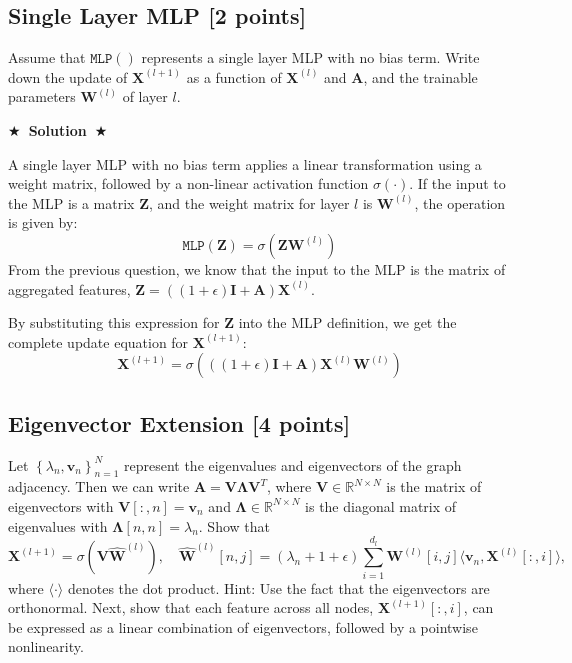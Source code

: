 \documentclass{article}
\numberwithin{figure}{section}
\newcommand{\Solution}[1]{%
    {%
        \medskip
        \color{red}
        \bf $\bigstar$~\sf\textbf{Solution}~$\bigstar$ \sf
        #1
    }
    \bigskip
}
\begin{document}
\subsection{Single Layer MLP [2 points]}
Assume that $\texttt{MLP}\left(\right)$ represents a single layer MLP with no bias term. Write down the update of $\mathbf{X}^{(l+1)}$ as a function of $\mathbf{X}^{(l)}$ and $\mathbf{A}$, and the trainable parameters $\mathbf{W}^{(l)}$ of layer $l$.

\Solution{
	A single layer MLP with no bias term applies a linear transformation using a weight matrix, followed by a non-linear activation function $\sigma(\cdot)$. If the input to the MLP is a matrix $\mathbf{Z}$, and the weight matrix for layer $l$ is $\mathbf{W}^{(l)}$, the operation is given by:
	\[ \texttt{MLP}(\mathbf{Z}) = \sigma(\mathbf{Z}\mathbf{W}^{(l)}) \]
	From the previous question, we know that the input to the MLP is the matrix of aggregated features, $\mathbf{Z} = \left( (1+\epsilon)\mathbf{I} + \mathbf{A}\right) \mathbf{X}^{(l)}$.
	
	By substituting this expression for $\mathbf{Z}$ into the MLP definition, we get the complete update equation for $\mathbf{X}^{(l+1)}$:
	\begin{equation}
		\mathbf{X}^{(l+1)} = \sigma\left( \left( (1+\epsilon)\mathbf{I} + \mathbf{A}\right) \mathbf{X}^{(l)} \mathbf{W}^{(l)} \right)
	\end{equation}
}

\subsection{Eigenvector Extension [4 points]}\label{probelm:eig}
Let $\left\{\lambda_n,\mathbf{v}_n\right\}_{n=1}^N$ represent the eigenvalues and eigenvectors of the graph adjacency. Then we can write $\mathbf{A}=\mathbf{V}\mathbf{\Lambda}\mathbf{V}^T$, where $\mathbf{V}\in\mathbb{R}^{N\times N}$ is the matrix of eigenvectors with $\mathbf{V}[:,n]=\mathbf{v}_n$ and $\mathbf{\Lambda}\in\mathbb{R}^{N\times N}$ is the diagonal matrix of eigenvalues with $\mathbf{\Lambda}[n,n]=\lambda_n$. Show that 
\begin{equation*}
\mathbf{X}^{(l+1)} =\sigma\left(\mathbf{V} \hat{\mathbf{W}}^{(l)}\right),\quad 
\hat{\mathbf{W}}^{(l)}\left[n, j\right] = \left(\lambda_n+1+\epsilon\right) \sum_{i=1}^{d_l}\mathbf{W}^{(l)}[i,j]\langle\mathbf{v}_n,\mathbf{X}^{(l)}\left[:,i\right]\rangle,
\end{equation*}
where $\langle\cdot\rangle$ denotes the dot product. Hint: Use the fact that the eigenvectors are orthonormal.
Next, show that each feature across all nodes, $\mathbf{X}^{(l+1)}[:,i]$, can be expressed as a linear combination of eigenvectors, followed by a pointwise nonlinearity. 
\end{document}
